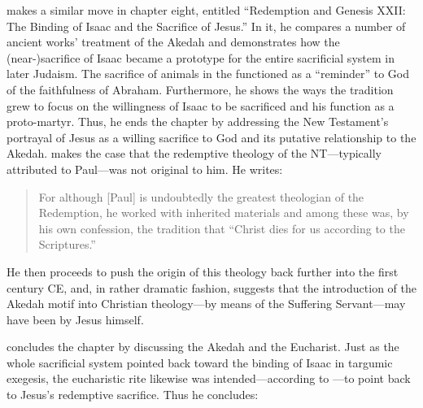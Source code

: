 \vermes makes a similar move in chapter eight, entitled ``Redemption and Genesis XXII: The Binding of Isaac and the Sacrifice of Jesus.'' In it, he compares a number of ancient works' treatment of the Akedah and demonstrates how the (near-)sacrifice of Isaac became a prototype for the entire sacrificial system in later Judaism. The sacrifice of animals in the \temple functioned as a ``reminder'' to God of the faithfulness of Abraham. Furthermore, he shows the ways the tradition grew to focus on the willingness of Isaac to be sacrificed and his function as a proto-martyr. Thus, he ends the chapter by addressing the New Testament's portrayal of Jesus as a willing sacrifice to God and its putative relationship to the Akedah. \vermes makes the case that the redemptive theology of the NT---typically attributed to Paul---was not original to him. He writes: 

\begin{quote}
    For although [Paul] is undoubtedly the greatest theologian of the Redemption, he worked with inherited materials and among these was, by his own confession, the tradition that ``Christ dies for us according to the Scriptures.''%
    \autocite[221]{vermes1961}
\end{quote}

\noindent
He then proceeds to push the origin of this theology back further into the first century CE, and, in rather dramatic fashion, suggests that the introduction of the Akedah motif into Christian theology---by means of the Suffering Servant---may have been by Jesus himself.%
    \autocite[223]{vermes1961}

\vermes concludes the chapter by discussing the Akedah and the Eucharist. Just as the whole sacrificial system pointed back toward the binding of Isaac in targumic exegesis, the eucharistic rite likewise was intended---according to \vermes---to point back to Jesus's redemptive sacrifice. Thus he concludes: 

